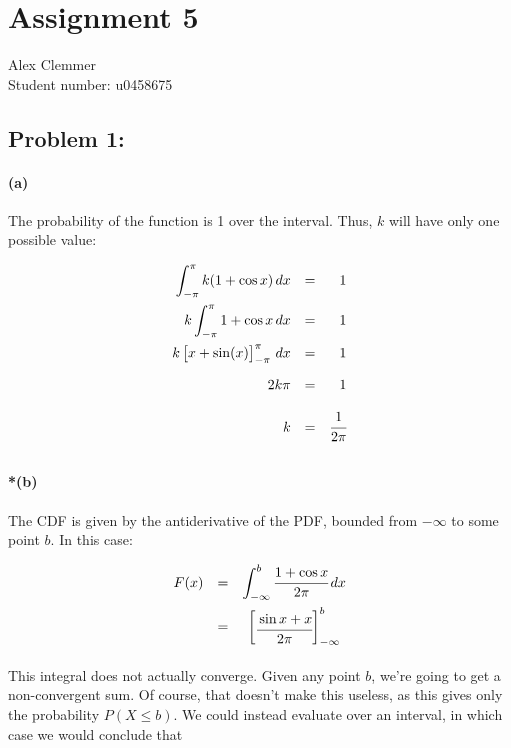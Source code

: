 \documentclass[a4paper]{article}
\begin{document}
\section*{Assignment 5}
Alex Clemmer\\
Student number: u0458675

\subsection*{Problem 1:} 

\paragraph{(a)} The probability of the function is 1 over the interval. Thus, $k$ will have only one possible value:

\begin{equation}
\begin{array}{rcr}
\displaystyle\int^\pi_{-\pi} k(1+ \cos{x})\,dx & = & 1 \\[.15in]
k\displaystyle\int^\pi_{-\pi} 1+ \cos{x}\,dx & = & 1 \\[.15in]
k \begin{bmatrix} x + \sin(x) \end{bmatrix}_{-\pi}^{\pi}\,dx & = & 1 \\[.15in]
2k\pi & = & 1 \\[.15in]
k & = & \cfrac{1}{2\pi} \\[.15in]
\end{array}
\end{equation}

\paragraph{*(b)} The CDF is given by the antiderivative of the PDF, bounded from $-\infty$ to some point $b$. In this case:

\begin{equation}
\begin{array}{rcc}
F(x) & = & \displaystyle\int^b_{-\infty} \cfrac{1+ \cos{x}}{2\pi}\,dx \\[.15in]
& = & \begin{bmatrix} \cfrac{\sin{x} + x}{2\pi}\end{bmatrix}^{b}_{-\infty} \\[.15in]
\end{array}
\end{equation}

This integral does not actually converge. Given any point $b$, we're going to get a non-convergent sum. Of course, that doesn't make this useless, as this gives only the probability $P(X \le b)$. We could instead evaluate over an interval, in which case we would conclude that
\end{document}
